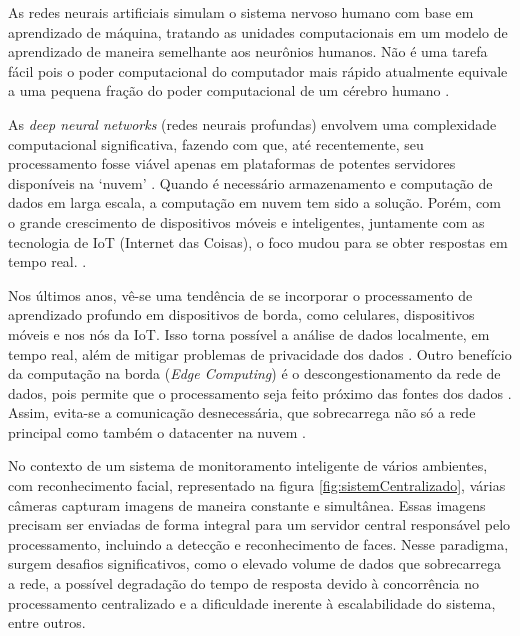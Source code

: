 As redes neurais artificiais simulam o sistema nervoso humano com base em aprendizado de máquina, tratando as unidades computacionais em um modelo de aprendizado de maneira semelhante aos neurônios humanos. Não é uma tarefa fácil pois o poder computacional do computador mais rápido atualmente equivale a uma pequena fração do poder computacional de um cérebro humano \cite{Aggarwal2018}.

As \textit{deep neural networks} (redes neurais profundas) envolvem uma complexidade computacional significativa, fazendo com que, até recentemente, seu processamento fosse viável apenas em plataformas de potentes servidores disponíveis na ‘nuvem’ \cite{Verhelst2017}. Quando é necessário armazenamento e computação de dados em larga escala, a computação em nuvem tem sido a solução. Porém, com o grande crescimento de dispositivos móveis e inteligentes, juntamente com as tecnologia de IoT (Internet das Coisas), o foco mudou para se obter respostas em tempo real. \cite{Dolui2017}.

Nos últimos anos, vê-se uma tendência de se incorporar o processamento de aprendizado profundo em dispositivos de borda, como celulares, dispositivos móveis e nos nós da IoT. Isso torna possível a análise de dados localmente, em tempo real, além de mitigar problemas de privacidade dos dados \cite{Verhelst2017}. Outro benefício da computação na borda (\textit{Edge Computing}) é o descongestionamento da rede de dados, pois permite que o processamento seja feito próximo das fontes dos dados \cite{Merenda2020}. Assim, evita-se a comunicação desnecessária, que sobrecarrega não só a rede principal como também o datacenter na nuvem \cite{Aazam2014}.

No contexto de um sistema de monitoramento inteligente de vários ambientes, com reconhecimento facial, representado na figura \ref{fig:sistemCentralizado}, várias câmeras capturam imagens de maneira constante e simultânea. Essas imagens precisam ser enviadas de forma integral para um servidor central responsável pelo processamento, incluindo a detecção e reconhecimento de faces. Nesse paradigma, surgem desafios significativos, como o elevado volume de dados que sobrecarrega a rede, a possível degradação do tempo de resposta devido à concorrência no processamento centralizado e a dificuldade inerente à escalabilidade do sistema, entre outros.

